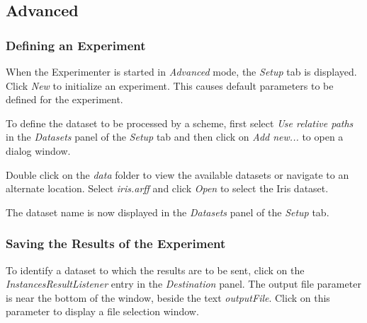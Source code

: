 \documentclass[a4paper]{article}
\begin{document}

\newpage
\subsection{Advanced}

\subsubsection{Defining an Experiment}

When the Experimenter is started in \textit{Advanced} mode, the \textit{Setup} tab is displayed. Click \textit{New} to initialize an experiment. This causes default parameters to be defined for the experiment.
\begin{center}
\end{center}

To define the dataset to be processed by a scheme, first select \textit{Use relative paths} in the \textit{Datasets} panel of the \textit{Setup} tab and then click on \textit{Add new...} to open a dialog window.
\begin{center}
\end{center}

Double click on the \textit{data} folder to view the available datasets or navigate to an alternate location. Select \textit{iris.arff} and click \textit{Open} to select the Iris dataset.
\begin{center}
\end{center}
	
\begin{center}
\end{center}

The dataset name is now displayed in the \textit{Datasets} panel of the \textit{Setup} tab.



\subsubsection*{Saving the Results of the Experiment}

To identify a dataset to which the results are to be sent, click on the \textit{InstancesResultListener} entry in the \textit{Destination} panel. The output file parameter is near the bottom of the window, beside the text \textit{outputFile}. Click on this parameter to display a file selection window.
\begin{center}
\end{center}
	
\end{document}
